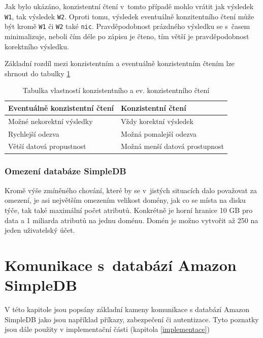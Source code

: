 \documentclass[oneside,12pt]{fithesis2}
\begin{document}
Jak bylo ukázáno, konzistentní čtení v~tomto případě mohlo vrátit jak výsledek \verb<W1<, tak výsledek \verb<W2<. Oproti tomu, výsledek eventuálně konzitentního čtení může být kromě \verb<W1< či \verb<W2< také \verb<nic<. Pravděpodobnost prázdného výsledku se s~časem minimalizuje, neboli čím déle po zápisu je čteno, tím větší je pravděpodobnost korektního výsledku.


Základní rozdíl mezi konzistentním a eventuálně konzistentním čtením lze shrnout do tabulky \ref{consistencyTable}
\begin{table}[h]
 \vspace{5mm}
 \begin{tabular}{l|l}
    Eventuálně konzistentní čtení & Konzistentní čtení\\ \hline
    Možné nekorektní výsledky & Vždy korektní výsledek\\ 
    Rychlejší odezva & Možná pomalejší odezva \\
    Větší datová propustnost & Možná menší datová prostupnost
 \end{tabular}
 \caption{Tabulka vlastností konzistentního a ev. konzistentního čtení}
 \label{consistencyTable}
\end{table}

\subsection{Omezení databáze SimpleDB}
Kromě výše zmíněného chování, které by se v~jistých situacích dalo považovat za omezení, je asi největším omezením velikost domény, jak co se místa na disku týče, tak také maximální počet atributů. Konkrétně je horní hranice 10 GB pro data a 1 miliarda atributů na jednu doménu. Domén je možno vytvořit až 250 na jeden uživatelský účet.


\chapter{Komunikace s~databází Amazon SimpleDB}
V této kapitole jsou popsány základní kameny komunikace s databází Amazon SimpleDB jako jsou například příkazy, zabezpečení či autentizace. Tyto poznatky jsou dále použity v implementační části (kapitola \ref{implementace})

\label{komunikace}
\end{document}
